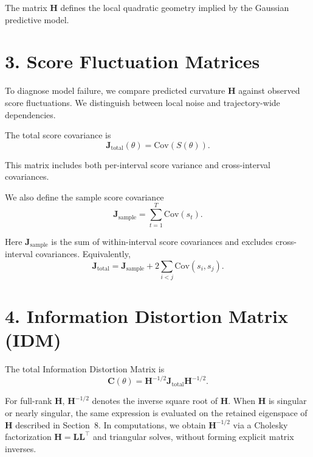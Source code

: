 \documentclass[11pt]{article}
\begin{document}
The matrix $\mathbf H$ defines the local quadratic geometry implied by the Gaussian predictive model.

\section*{3. Score Fluctuation Matrices}

To diagnose model failure, we compare predicted curvature $\mathbf H$ against observed score fluctuations. We distinguish between local noise and trajectory-wide dependencies.

The total score covariance is
\begin{equation}
\mathbf J_{\mathrm{total}}(\theta)
=
\mathrm{Cov}\!\left(S(\theta)\right).
\end{equation}

This matrix includes both per-interval score variance and cross-interval covariances.

We also define the sample score covariance
\begin{equation}
\mathbf J_{\mathrm{sample}}
=
\sum_{t=1}^T \mathrm{Cov}(s_t).
\end{equation}

Here $\mathbf J_{\mathrm{sample}}$ is the sum of within-interval score covariances and excludes cross-interval covariances. Equivalently,
\begin{equation}
\mathbf J_{\mathrm{total}}
=
\mathbf J_{\mathrm{sample}} + 2\sum_{i<j}\mathrm{Cov}(s_i,s_j).
\end{equation}

\section*{4. Information Distortion Matrix (IDM)}

The total Information Distortion Matrix is
\begin{equation}
\mathbf C(\theta)
=
\mathbf H^{-1/2}
\mathbf J_{\mathrm{total}}
\mathbf H^{-1/2}.
\end{equation}

For full-rank $\mathbf H$, $\mathbf H^{-1/2}$ denotes the inverse square root of $\mathbf H$.
When $\mathbf H$ is singular or nearly singular, the same expression is evaluated on the retained eigenspace of $\mathbf H$ described in Section~8.
In computations, we obtain $\mathbf H^{-1/2}$ via a Cholesky factorization
$\mathbf H = \mathbf L \mathbf L^\top$ and triangular solves, without forming explicit matrix inverses.
\end{document}
